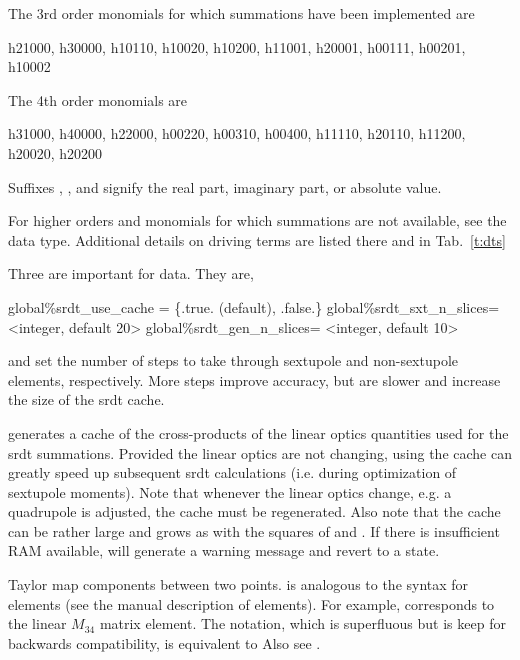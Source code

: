 \begin{description}
{{{{{{{{{The 3rd order monomials for which summations have been implemented are
\begin{example}
  h21000, h30000, h10110, h10020, h10200,
  h11001, h20001, h00111, h00201, 
  h10002
\end{example}

The 4th order monomials are 
\begin{example}
  h31000, h40000, h22000,
  h00220, h00310, h00400, 
  h11110, h20110, h11200, h20020, h20200
\end{example}

Suffixes , , and  signify the real part, imaginary part, or absolute value.

For higher orders and monomials for which summations are not available, see the \Newline
{} data type.  Additional details on driving terms are listed there
and in Tab.~\ref{t:dts}

Three   are important for  data.  They are,
\begin{example}
  global{\%}srdt_use_cache = \{.true. (default), .false.\}
  global{\%}srdt_sxt_n_slices= <integer, default 20>
  global{\%}srdt_gen_n_slices= <integer, default 10>
\end{example}

 and  set the number of steps to take through sextupole
and non-sextupole elements, respectively.  More steps improve accuracy, but are slower and increase
the size of the srdt cache.

 generates a cache of the cross-products of the linear optics quantities used for
the srdt summations.  Provided the linear optics are not changing, using the cache can greatly speed
up subsequent srdt calculations (i.e. during optimization of sextupole moments).  Note that whenever
the linear optics change, e.g. a quadrupole is adjusted, the cache must be regenerated.  Also note
that the cache can be rather large and grows as with the squares of  and
.  If there is insufficient RAM available,  will generate a warning
message and revert to a  state.

  \item[t.$ijklm\ldots$,  tt.$ijklm\ldots$ \hspace{0.2in} $1 \le i,j,k,\ldots \le 6$] \Newline {}
Taylor map components between two points.  is analogous to the  syntax for
 elements (see the \bmad manual description of  elements). For example,
 corresponds to the linear $M_{34}$ matrix element. The  notation,
which is superfluous but is keep for backwards compatibility, is equivalent to 
Also see .

}}}}}}}}}
\end{description}
